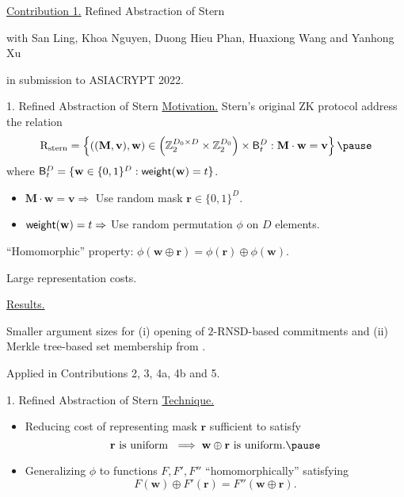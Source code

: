 \begin{frame}{}
	\underline{Contribution 1.} Refined Abstraction of Stern
	
	{\small with San Ling, Khoa Nguyen, Duong Hieu Phan, Huaxiong Wang and Yanhong Xu}
	
	in submission to ASIACRYPT 2022.
\end{frame}

\begin{frame}{1. Refined Abstraction of Stern}
	\underline{Motivation.} Stern's original ZK protocol address the relation \pause
	\begin{equation*}
		\RelationStern = \left\{((\mathbf{M},\mathbf{v}), \mathbf{w}) \in \left(\mathbb{Z}_2^{D_0\times D}\times \mathbb{Z}_2^{D_0}\right)\times \FixedWeightSet^D_t : \mathbf{M}\cdot\mathbf{w} = \mathbf{v}\right\}\pause
	\end{equation*}
	where $\mathsf{B}^D_t = \{\mathbf{w} \in \{0,1\}^D : \mathsf{weight}(\mathbf{w}) = t\}$.\pause
	\begin{itemize}
			\item $\mathbf{M}\cdot\mathbf{w} =\mathbf{v} \Rightarrow$ Use random mask $\mathbf{r} \in \{0,1\}^D$.\pause
			\item $\mathsf{weight}(\mathbf{w}) = t \Rightarrow$ Use random permutation $\phi$ on $D$ elements.\pause
	\end{itemize}
	
	``Homomorphic'' property: $\phi(\mathbf{w} \oplus \mathbf{r}) = \phi(\mathbf{r}) \oplus \phi(\mathbf{w})$.\pause
	
	Large representation costs.
	
	\underline{Results.}\pause
	
	Smaller argument sizes for (i) opening of $2$-RNSD-based commitments and (ii) Merkle tree-based set membership from \cite{NguyenTWZ19}.\pause
	
	Applied in Contributions 2, 3, 4a, 4b and 5.
\end{frame}

\begin{frame}{1. Refined Abstraction of Stern}
	\underline{Technique.}\pause
	\begin{itemize}
		\item Reducing cost of representing mask $\mathbf{r}$ sufficient to satisfy \pause
		\begin{equation*}
			\mathbf{r} \text{ is uniform } \implies \mathbf{w} \oplus \mathbf{r} \text{ is uniform.}\pause
		\end{equation*}  
		\item Generalizing $\phi$ to functions $F, F', F''$ ``homomorphically'' satisfying\pause
		\begin{equation*}
			F(\mathbf{w}) \oplus F'(\mathbf{r}) = F''(\mathbf{w} \oplus \mathbf{r}).
		\end{equation*}
	\end{itemize}
\end{frame}